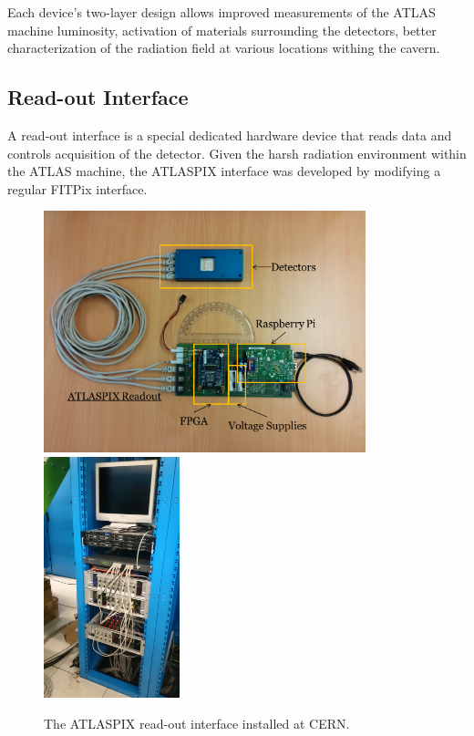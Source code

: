 Each device's two-layer design allows improved measurements of the ATLAS machine luminosity, activation of materials surrounding the detectors, better characterization of the radiation field at various locations withing the cavern.

\subsection{Read-out Interface}
A read-out interface is a special dedicated hardware device that reads data and controls acquisition of the detector. \cite{Pixelman} Given the harsh radiation environment within the ATLAS machine, the ATLASPIX interface was developed by modifying a regular FITPix interface. \cite{FITPix}

\begin{figure}[t]
\begin{center}
\includegraphics[height=7cm]{figures/imported/atlaspix}
\includegraphics[height=7cm]{figures/imported/atlaspix-installed}
\caption{The ATLASPIX read-out interface installed at CERN.}
\label{fig:ATLASPIX}
\end{center}
\end{figure}

